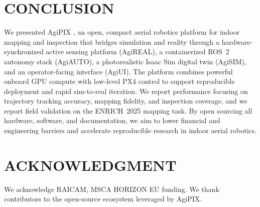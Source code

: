 \documentclass[letterpaper, 10 pt, conference]{ieeeconf}  %
\newcommand{\Agipix}{AgiPIX}
\newcommand{\Agiautonomy}{AgiAUTO}
\newcommand{\Agisim}{AgiSIM}
\newcommand{\Agiui}{AgiUI}
\newcommand{\Agihw}{AgiREAL}
\newcommand{\Agipixs}{AgiPIX }
\begin{document}
\section{CONCLUSION}\label{sec:conclusion}
We presented \Agipixs, an open, compact aerial robotics platform for indoor mapping and inspection that bridges simulation and reality through a hardware-synchronized active sensing platform (\Agihw), a containerized ROS~2 autonomy stack (\Agiautonomy), a photorealistic Isaac Sim digital twin (\Agisim), and an operator-facing interface (\Agiui). The platform combines powerful onboard GPU compute with low-level PX4 control to support reproducible deployment and rapid sim-to-real iteration. We report performance focusing on trajectory tracking accuracy, mapping fidelity, and inspection coverage, and we report field validation on the ENRICH~2025 mapping task. By open sourcing all hardware, software, and documentation, we aim to lower financial and engineering barriers and accelerate reproducible research in indoor aerial robotics.

\section*{ACKNOWLEDGMENT}
We acknowledge RAICAM, MSCA HORIZON EU funding. We thank contributors to the open-source ecosystem leveraged by \Agipix.



\end{document}
